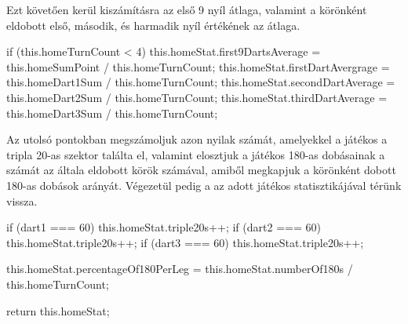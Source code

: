 Ezt követően kerül kiszámításra az első 9 nyíl átlaga, valamint a körönként eldobott első, második, és harmadik nyíl értékének az átlaga.

\begin{cpp}
if (this.homeTurnCount < 4) {
 this.homeStat.first9DartsAverage = this.homeSumPoint / this.homeTurnCount;
}
this.homeStat.firstDartAvergrage = this.homeDart1Sum / this.homeTurnCount;
this.homeStat.secondDartAverage = this.homeDart2Sum / this.homeTurnCount;
this.homeStat.thirdDartAverage = this.homeDart3Sum / this.homeTurnCount;
\end{cpp}

Az utolsó pontokban megszámoljuk azon nyilak számát, amelyekkel a játékos a tripla 20-as szektor találta el, valamint elosztjuk a játékos 180-as dobásainak a számát az általa eldobott körök számával, amiből megkapjuk a körönként dobott 180-as dobások arányát. Végezetül pedig a az adott játékos statisztikájával térünk vissza.

\begin{cpp}
if (dart1 === 60) {
 this.homeStat.triple20s++;
}
if (dart2 === 60) {
 this.homeStat.triple20s++;
}
if (dart3 === 60) {
 this.homeStat.triple20s++;
}

this.homeStat.percentageOf180PerLeg = 
 this.homeStat.numberOf180s / this.homeTurnCount;
        
return this.homeStat;
\end{cpp}